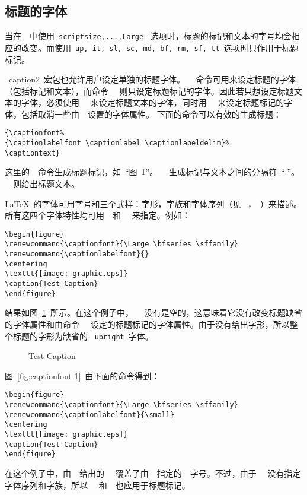 \subsection{标题的字体}

当在~~中使用~\texttt{scriptsize,...,Large}~
选项时，标题的标记和文本的字号均会相应的改变。而使用~\texttt{up, it, sl,
	sc, md, bf, rm, sf, tt}~选项时只作用于标题标记。

~\textsf{caption2}~宏包也允许用户设定单独的标题字体。~~
命令可用来设定标题的字体（包括标记和文本），而命令~~
则只设定标题标记的字体。因此若只想设定标题文本的字体，必须使用
~~来设定标题文本的字体，同时用~~
来设定标题标记的字体，包括取消一些由~~设置的字体属性。
下面的命令可以有效的生成标题：
\begin{Verbatim}[xleftmargin=1cm]
{\captionfont% 
{\captionlabelfont \captionlabel \captionlabeldelim}% 
\captiontext}
\end{Verbatim}
这里的~~命令生成标题标记，如~``{图~1}''。
~~生成标记与文本之间的分隔符~``:''。
~~则给出标题文本。

\LaTeX{}~的字体可用字号和三个式样：字形，字族和字体序列（见
~\cite[第~37,115~页]{Leslie}，~\cite[第~170-171~页]{Michel}）来描述。
所有这四个字体特性均可用~~和~~
来指定。例如：
\begin{Verbatim}[xleftmargin=1cm]
\begin{figure} 
\renewcommand{\captionfont}{\Large \bfseries \sffamily} 
\renewcommand{\captionlabelfont}{} 
\centering 
\texttt{[image: graphic.eps]} 
\caption{Test Caption} 
\end{figure}
\end{Verbatim}
结果如图~\ref{fig:captionfont}~所示。在这个例子中，~~
没有是空的，这意味着它没有改变标题缺省的字体属性和由命令~~
设定的标题标记的字体属性。由于没有给出字形，所以整个标题的字形为缺省的~
\texttt{upright}~字体。

\begin{figure} 
	\renewcommand{\captionfont}{\Large \bfseries \sffamily} 
	\renewcommand{\captionlabelfont}{} 
	\centering 
	\resizebox{2in}{!}{\usebox{\graphic}}
	\caption{Test Caption}\label{fig:captionfont}
\end{figure}

图~\ref{fig:captionfont-1}~由下面的命令得到：
\begin{Verbatim}[xleftmargin=1cm]
\begin{figure} 
\renewcommand{\captionfont}{\Large \bfseries \sffamily} 
\renewcommand{\captionlabelfont}{\small} 
\centering 
\texttt{[image: graphic.eps]} 
\caption{Test Caption} 
\end{figure}
\end{Verbatim}
在这个例子中，由~~给出的~~
覆盖了由~~指定的~~字号。不过，由于
~~没有指定字体序列和字族，所以~~
和~~也应用于标题标记。


